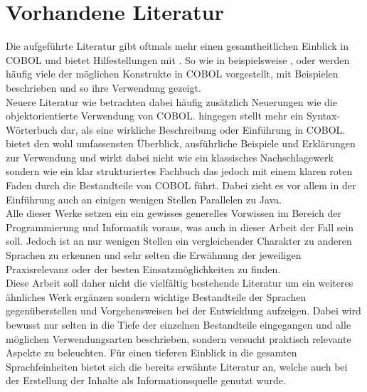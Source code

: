 \section{Vorhandene Literatur}
Die aufgeführte Literatur gibt oftmals mehr einen gesamtheitlichen Einblick in COBOL und bietet Hilfestellungen mit . So wie in beispielsweise ,   oder  werden häufig viele der möglichen Konstrukte in COBOL vorgestellt, mit Beispielen beschrieben und so ihre Verwendung gezeigt. \\

Neuere Literatur wie  betrachten dabei häufig zusätzlich Neuerungen wie die objektorientierte Verwendung von COBOL.  
hingegen stellt mehr ein Syntax-Wörterbuch dar, als eine wirkliche Beschreibung oder Einführung in COBOL.\\

 bietet den wohl umfassensten Überblick, ausführliche Beispiele und Erklärungen zur Verwendung und wirkt dabei nicht wie ein klassisches Nachschlagewerk sondern wie ein klar strukturiertes Fachbuch das jedoch mit einem klaren roten Faden durch die Bestandteile von COBOL führt. Dabei zieht es vor allem in der Einführung auch an einigen wenigen Stellen Parallelen zu Java. \\

Alle dieser Werke setzen ein ein gewisses generelles Vorwissen im Bereich der Programmierung und Informatik voraus, was auch in dieser Arbeit der Fall sein soll. Jedoch ist an nur wenigen Stellen ein vergleichender Charakter zu anderen Sprachen zu erkennen und sehr selten die Erwähnung der jeweiligen Praxisrelevanz oder der besten Einsatzmöglichkeiten zu finden. \\

Diese Arbeit soll daher nicht die vielfältig bestehende Literatur um ein weiteres ähnliches Werk ergänzen sondern wichtige Bestandteile der Sprachen gegenüberstellen und Vorgehensweisen bei der Entwicklung aufzeigen. Dabei wird bewusst nur selten in die Tiefe der einzelnen Bestandteile eingegangen und alle möglichen Verwendungsarten beschrieben, sondern versucht praktisch relevante Aspekte zu beleuchten. Für einen tieferen Einblick in die gesamten Sprachfeinheiten bietet sich die bereits erwähnte Literatur an, welche auch bei der Erstellung der Inhalte als Informationsquelle genutzt wurde.

